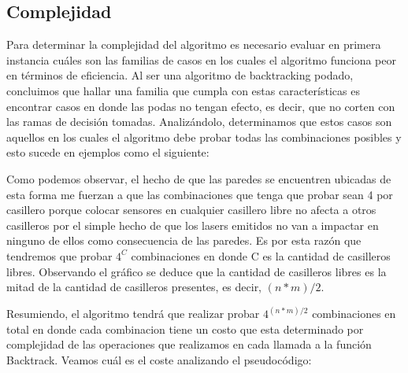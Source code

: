 \subsection{Complejidad}
Para determinar la complejidad del algoritmo es necesario evaluar en primera instancia cuáles son las familias de casos en los cuales el algoritmo funciona peor en términos de eficiencia. Al ser una algoritmo de backtracking podado, concluimos que hallar una familia que cumpla con estas características es encontrar casos en donde las podas no tengan efecto, es decir, que no corten con las ramas de decisión tomadas. Analizándolo, determinamos que estos casos son aquellos en los cuales el algoritmo debe probar todas las combinaciones posibles y esto sucede en ejemplos como el siguiente:


Como podemos observar, el hecho de que las paredes se encuentren ubicadas de esta forma me fuerzan a que las combinaciones que tenga que probar sean 4 por casillero porque colocar sensores en cualquier casillero libre no afecta a otros casilleros por el simple hecho de que los lasers emitidos no van a impactar en ninguno de ellos como consecuencia de las paredes. Es por esta razón que tendremos que probar $4^C$ combinaciones en donde C es la cantidad de casilleros libres. Observando el gráfico se deduce que la cantidad de casilleros libres es la mitad de la cantidad de casilleros presentes, es decir, $(n*m)/2$.

Resumiendo, el algoritmo tendrá que realizar probar $4^{(n*m)/2}$ combinaciones en total en donde cada combinacion tiene un costo que esta determinado por complejidad de las operaciones que realizamos en cada llamada a la función Backtrack. Veamos cuál es el coste analizando el pseudocódigo:

